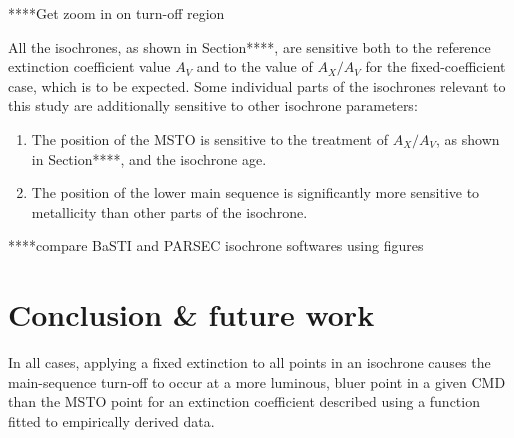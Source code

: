 \documentclass[12pt, a4paper]{report}
\begin{document}
****Get zoom in on turn-off region

All the isochrones, as shown in Section****, are sensitive both to the reference extinction coefficient value $A_{V}$ and to the value of $A_{X}/A_{V}$ for the fixed-coefficient case, which is to be expected. Some individual parts of the isochrones relevant to this study are additionally sensitive to other isochrone parameters:

\begin{enumerate}
\item The position of the MSTO is sensitive to the treatment of $A_{X}/A_{V}$, as shown in Section****, and the isochrone age.
\item The position of the lower main sequence is significantly more sensitive to metallicity than other parts of the isochrone.
\end{enumerate}

****compare BaSTI and PARSEC isochrone softwares using \cite{2019MNRAS.483.4949G} figures

\chapter{Conclusion \& future work}
In all cases, applying a fixed extinction to all points in an isochrone causes the main-sequence turn-off to occur at a more luminous, bluer point in a given CMD than the MSTO point for an extinction coefficient described using a function fitted to empirically derived data.

%

\end{document}
